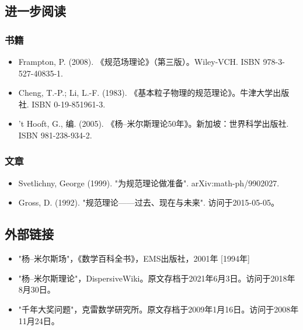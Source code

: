 \subsection{进一步阅读}
\subsubsection{书籍} 
\begin{itemize}
\item Frampton, P. (2008). 《规范场理论》（第三版）。Wiley-VCH. ISBN 978-3-527-40835-1.  
\item Cheng, T.-P.; Li, L.-F. (1983). 《基本粒子物理的规范理论》。牛津大学出版社. ISBN 0-19-851961-3.  
\item 't Hooft, G., 编. (2005). 《杨–米尔斯理论50年》。新加坡：世界科学出版社. ISBN 981-238-934-2.
\end{itemize}
\subsubsection{文章} 
\begin{itemize}
\item Svetlichny, George (1999). "为规范理论做准备". arXiv:math-ph/9902027.  
\item Gross, D. (1992). "规范理论——过去、现在与未来". 访问于2015-05-05。
\end{itemize}
\subsection{外部链接}
\begin{itemize}
\item "杨–米尔斯场"，《数学百科全书》，EMS出版社，2001年 [1994年]  
\item "杨–米尔斯理论"，DispersiveWiki。原文存档于2021年6月3日。访问于2018年8月30日。  
\item "千年大奖问题"，克雷数学研究所。原文存档于2009年1月16日。访问于2008年11月24日。
\end{itemize}